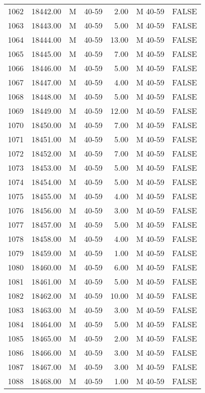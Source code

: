 \begin{table}[ht]
\begin{tabular}{rrllrll}
  1062 & 18442.00 & M & 40-59 & 2.00 & M 40-59 & FALSE \\ 
  1063 & 18443.00 & M & 40-59 & 5.00 & M 40-59 & FALSE \\ 
  1064 & 18444.00 & M & 40-59 & 13.00 & M 40-59 & FALSE \\ 
  1065 & 18445.00 & M & 40-59 & 7.00 & M 40-59 & FALSE \\ 
  1066 & 18446.00 & M & 40-59 & 5.00 & M 40-59 & FALSE \\ 
  1067 & 18447.00 & M & 40-59 & 4.00 & M 40-59 & FALSE \\ 
  1068 & 18448.00 & M & 40-59 & 5.00 & M 40-59 & FALSE \\ 
  1069 & 18449.00 & M & 40-59 & 12.00 & M 40-59 & FALSE \\ 
  1070 & 18450.00 & M & 40-59 & 7.00 & M 40-59 & FALSE \\ 
  1071 & 18451.00 & M & 40-59 & 5.00 & M 40-59 & FALSE \\ 
  1072 & 18452.00 & M & 40-59 & 7.00 & M 40-59 & FALSE \\ 
  1073 & 18453.00 & M & 40-59 & 5.00 & M 40-59 & FALSE \\ 
  1074 & 18454.00 & M & 40-59 & 5.00 & M 40-59 & FALSE \\ 
  1075 & 18455.00 & M & 40-59 & 4.00 & M 40-59 & FALSE \\ 
  1076 & 18456.00 & M & 40-59 & 3.00 & M 40-59 & FALSE \\ 
  1077 & 18457.00 & M & 40-59 & 5.00 & M 40-59 & FALSE \\ 
  1078 & 18458.00 & M & 40-59 & 4.00 & M 40-59 & FALSE \\ 
  1079 & 18459.00 & M & 40-59 & 1.00 & M 40-59 & FALSE \\ 
  1080 & 18460.00 & M & 40-59 & 6.00 & M 40-59 & FALSE \\ 
  1081 & 18461.00 & M & 40-59 & 5.00 & M 40-59 & FALSE \\ 
  1082 & 18462.00 & M & 40-59 & 10.00 & M 40-59 & FALSE \\ 
  1083 & 18463.00 & M & 40-59 & 3.00 & M 40-59 & FALSE \\ 
  1084 & 18464.00 & M & 40-59 & 5.00 & M 40-59 & FALSE \\ 
  1085 & 18465.00 & M & 40-59 & 2.00 & M 40-59 & FALSE \\ 
  1086 & 18466.00 & M & 40-59 & 3.00 & M 40-59 & FALSE \\ 
  1087 & 18467.00 & M & 40-59 & 3.00 & M 40-59 & FALSE \\ 
  1088 & 18468.00 & M & 40-59 & 1.00 & M 40-59 & FALSE \\ 

\end{tabular}
\end{table}
